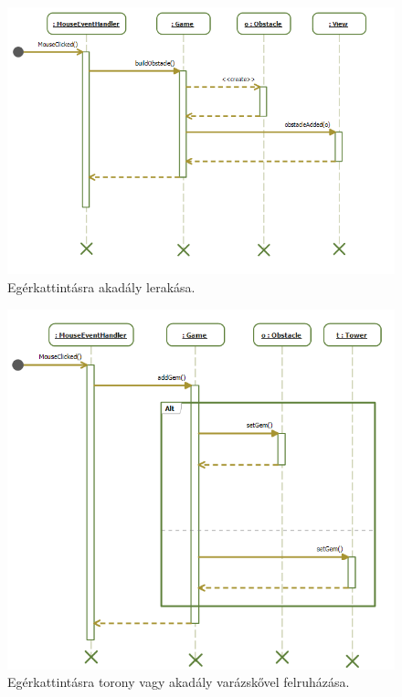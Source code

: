 \begin{figure}[H]
\begin{center}
\includegraphics[width=18cm]{images/grafikaSeq/mouseOb.png}
\caption{Egérkattintásra akadály lerakása.}
\label{fig:Graphic_mouse_obstacle}
\end{center}
\end{figure}

\begin{figure}[H]
\begin{center}
\includegraphics[width=18cm]{images/grafikaSeq/mouseEnch.png}
\caption{Egérkattintásra torony vagy akadály varázskővel felruházása.}
\label{fig:Graphic_mouse_enchant}
\end{center}
\end{figure}

